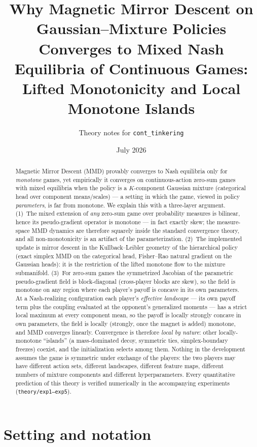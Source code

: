 \documentclass[11pt]{article}
\title{Why Magnetic Mirror Descent on Gaussian--Mixture Policies\\
Converges to Mixed Nash Equilibria of Continuous Games:\\
Lifted Monotonicity and Local Monotone Islands}
\author{Theory notes for \texttt{cont\_tinkering}}
\date{July 2026}
\theoremstyle{definition}
\begin{document}
\maketitle

\begin{abstract}
Magnetic Mirror Descent (MMD) provably converges to Nash equilibria only for
\emph{monotone} games, yet empirically it converges on continuous-action
zero-sum games with mixed equilibria when the policy is a $K$-component
Gaussian mixture (categorical head over component means/scales) --- a setting in
which the game, viewed in policy \emph{parameters}, is far from monotone. We
explain this with a three-layer argument. (1)~The mixed extension of \emph{any}
zero-sum game over probability measures is bilinear, hence its pseudo-gradient
operator is monotone --- in fact exactly skew; the measure-space MMD dynamics are
therefore squarely inside the standard convergence theory, and all
non-monotonicity is an artifact of the parameterization. (2)~The implemented
update is mirror descent in the Kullback--Leibler geometry of the hierarchical
policy (exact simplex MMD on the categorical head, Fisher--Rao natural gradient
on the Gaussian heads): it is the restriction of the lifted monotone flow to
the mixture submanifold. (3)~For zero-sum games the symmetrized Jacobian of the
parametric pseudo-gradient field is block-diagonal (cross-player blocks are
skew), so the field is monotone on any region where each player's payoff is
concave in its own parameters. At a Nash-realizing configuration each player's
\emph{effective landscape} --- its own payoff term plus the coupling evaluated
at the opponent's generalized moments --- has a strict local maximum at every
component mean, so the payoff is locally strongly concave in own parameters,
the field is locally (strongly, once the magnet is added) monotone, and MMD
converges linearly. Convergence is therefore \emph{local by nature}: other
locally-monotone ``islands'' (a mass-dominated decoy, symmetric ties,
simplex-boundary freezes) coexist, and the initialization selects among them.
Nothing in the development assumes the game is symmetric under exchange of the
players: the two players may have different action sets, different landscapes,
different feature maps, different numbers of mixture components and different
hyperparameters. Every quantitative prediction of this theory is verified
numerically in the accompanying experiments (\texttt{theory/exp1--exp5}).
\end{abstract}

\section{Setting and notation}
\end{document}
